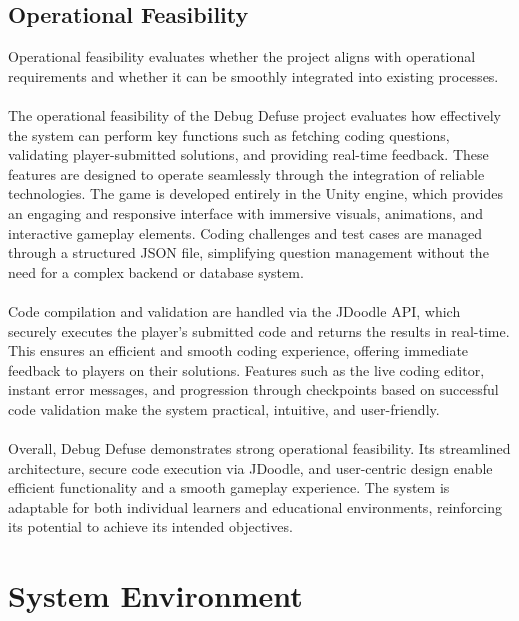  \subsection{Operational Feasibility}
 Operational feasibility evaluates whether the project aligns with operational requirements and whether it can be smoothly integrated into existing processes.\\\\
 The operational feasibility of the Debug Defuse project evaluates how effectively the system can perform key functions such as fetching coding questions, validating player-submitted solutions, and providing real-time feedback. These features are designed to operate seamlessly through the integration of reliable technologies. The game is developed entirely in the Unity engine, which provides an engaging and responsive interface with immersive visuals, animations, and interactive gameplay elements. Coding challenges and test cases are managed through a structured JSON file, simplifying question management without the need for a complex backend or database system.\\\\
\noindent
Code compilation and validation are handled via the JDoodle API, which securely executes the player's submitted code and returns the results in real-time. This ensures an efficient and smooth coding experience, offering immediate feedback to players on their solutions. Features such as the live coding editor, instant error messages, and progression through checkpoints based on successful code validation make the system practical, intuitive, and user-friendly.\\\\
\noindent
Overall, Debug Defuse demonstrates strong operational feasibility. Its streamlined architecture, secure code execution via JDoodle, and user-centric design enable efficient functionality and a smooth gameplay experience. The system is adaptable for both individual learners and educational environments, reinforcing its potential to achieve its intended objectives.
 \section{System Environment}
 
